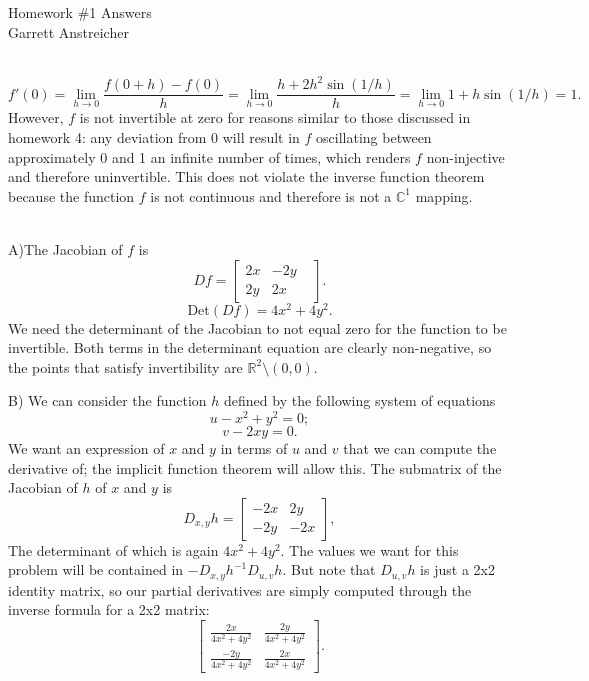 \documentclass[12pt,leqno]{article}
\begin{document}
\begin{center}
\Large{Homework {\#}1 Answers}\\
\large{Garrett Anstreicher}
\end{center}

\bigskip
{}\\
\indent 
$$f'(0) =\lim_{h \rightarrow 0} \frac{f(0 + h) - f(0)}{h} = \lim_{h \rightarrow 0} \frac{h + 2h^2 \sin(1/h)}{h} = \lim_{h \rightarrow 0} 1 + h \sin(1/h) = 1.$$
However, $f$ is not invertible at zero for reasons similar to those discussed in homework 4: any deviation from 0 will result in $f$ oscillating between approximately 0 and 1 an infinite number of times, which renders $f$ non-injective and therefore uninvertible. This does not violate the inverse function theorem because the function $f$ is not continuous and therefore is not a $\mathds{C}^1$ mapping.

\bigskip
{}\\
\indent A)The Jacobian of $f$ is
$$Df = \begin{bmatrix}
2x & -2y&\\
2y & 2x
\end{bmatrix}.$$
$$\text{Det}(Df) = 4x^2 + 4y^2.$$
We need the determinant of the Jacobian to not equal zero for the function to be invertible. Both terms in the determinant equation are clearly non-negative, so the points that satisfy invertibility are $\mathds{R}^2 \setminus (0, 0).$

\indent B) We can consider the function $h$ defined by the following system of equations
$$u - x^2 + y^2 = 0;$$
$$v - 2xy = 0.$$
We want an expression of $x$ and $y$ in terms of $u$ and $v$ that we can compute the derivative of; the implicit function theorem will allow this. The submatrix of the Jacobian of $h$ of $x$ and $y$ is
$$D_{x,y}h = \begin{bmatrix}
	-2x & 2y \\
	-2y & -2x
\end{bmatrix},$$
The determinant of which is again $4x^2 + 4y^2$. The values we want for this problem will be contained in $-D_{x,y}h^{-1} D_{u, v}h$. But note that $D_{u, v}h$ is just a 2x2 identity matrix, so our partial derivatives are simply computed through the inverse formula for a 2x2 matrix:
$$\begin{bmatrix}
\frac{2x}{4x^2 + 4y^2} & \frac{2y}{4x^2 + 4y^2} \\
\frac{-2y}{4x^2 + 4y^2} & \frac{2x}{4x^2 + 4y^2}
\end{bmatrix}.$$ 
\end{document}
